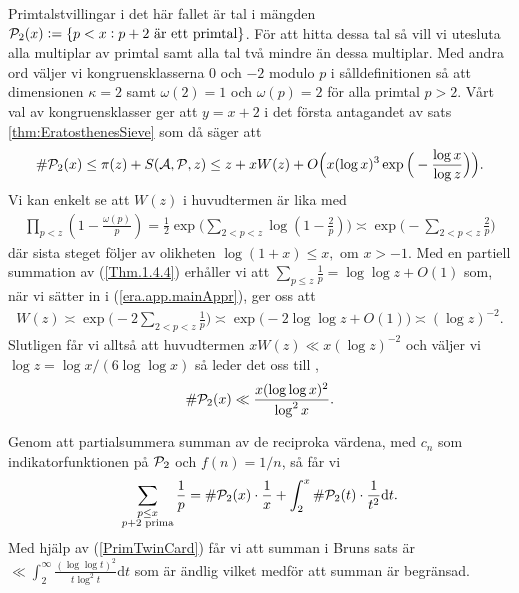 Primtalstvillingar i det här fallet är tal i mängden \(\P_2(x) := \{p < x : p + 2 \text{ är ett primtal}\}\). För att hitta dessa tal så vill vi utesluta alla multiplar av primtal samt alla tal två mindre än dessa multiplar. Med andra ord väljer vi kongruensklasserna $0$ och $-2$ modulo $p$ i sålldefinitionen så att dimensionen \(\kappa = 2\) samt \(\omega(2) = 1\) och \(\omega(p) = 2\) för alla primtal $p > 2$. Vårt val av kongruensklasser ger att \(y = x + 2\) i det första antagandet av sats \ref{thm:EratosthenesSieve} som då säger att
\begin{align*}
    \card{\P_2(x)} \leq \pi(z) + \S{A}{P}{z} \leq z + x W(z) + O\Big(x (\log x)^3 \exp \Big( - \frac{\log x}{\log z} \Big) \Big).
\end{align*}
Vi kan enkelt se att \(W(z)\) i huvudtermen är lika med
\begin{align}
    \prod_{p < z}\left( 1 - \frac{\omega(p)}{p} \right) = \frac{1}{2} \exp \Bigg( \sum_{2 <p < z} \log \left( 1 - \frac{2}{p} \right) \Bigg) \asymp \exp \Bigg( - \sum_{2 <p < z} \frac{2}{p}  \Bigg) \label{era.app.mainAppr}
\end{align}
där sista steget följer av olikheten \(\log(1 + x) \leq x, \text{ om } x > -1\). Med en partiell summation av (\ref{Thm.1.4.4}) erhåller vi att \(\sum_{p \leq z} \frac{1}{p} = \log \log z + O(1)\) som, när vi sätter in i (\ref{era.app.mainAppr}), ger oss att
\begin{align} \label{era.app.secondMainAppr} 
    W(z) \asymp \exp \Bigg( - 2 \sum_{2 <p < z} \frac{1}{p}  \Bigg) \asymp \exp \big( -2 \log \log z + O(1)  \big) \asymp (\log z)^{-2}.
\end{align}
Slutligen får vi alltså att huvudtermen \(x W(z) \ll x (\log z)^{-2}\) och väljer vi \(\log z = \log x / (6 \log \log x)\) så leder det oss till \cite[Sats 5.4.4]{cojocarumurty}, 
\begin{align} \label{PrimTwinCard}
    \card{\P_2(x)} \ll \frac{x (\log \log x)^2}{\log^2 x} .
\end{align}

Genom att partialsummera summan av de reciproka värdena, med \(c_n\) som indikatorfunktionen på \(\P_2\) och \(f(n) = 1 / n\), så får vi 
\begin{align*}
    \sum_{\substack{p \leq x \\ p + 2 \text{ prima}}} \frac{1}{p} = \card{\P_2(x)} \cdot \frac{1}{x} + \int_2^x \card{\P_2(t)} \cdot \frac{1}{t^2} \text{d}t . 
\end{align*}
Med hjälp av (\ref{PrimTwinCard}) får vi att summan i Bruns sats är \(\ll \int_2^\infty \frac{(\log \log t)^2}{t \log^2 t} \text{d}t\) som är ändlig vilket medför att summan är begränsad. 

